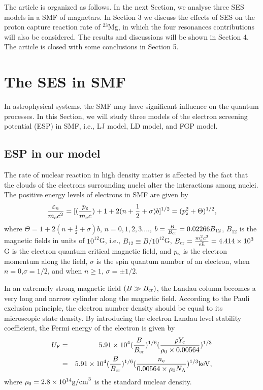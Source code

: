 \documentclass[manuscript]{aastex}
\begin{document}
The article is organized as follows. In the next Section, we analyse
three SES models in a SMF of magnetars. In Section 3 we discuss the
effects of SES on the proton capture reaction rate of $^{23}$Mg, in
which the four resonances contributions will also be considered. The
results and discussions will be shown in Section 4. The article is
closed with some conclusions in Section 5.

\section{The SES in SMF}

In astrophysical systems, the SMF may have significant influence on
the quantum processes. In this Section, we will study three models
of the electron screening potential (ESP) in SMF, i.e., LJ model, LD
model, and FGP model.

\subsection{ESP in our model}

The rate of nuclear reaction in high density matter is affected by
the fact that the clouds of the electrons surrounding nuclei alter
the interactions among nuclei. The positive energy levels of
electrons in SMF are given by \citep{Landau77}
\begin{equation}
   \frac{\varepsilon_n}{m_{\rm{e}} c^2}=[(\frac{p_{\rm{z}}}{m_{\rm{e}}c})+1+2(n+\frac{1}{2}+\sigma)b]^{1/2}=(p^2_{\rm{z}}+\Theta)^{1/2},
\label{1}
\end{equation}
 where $\Theta=1+2(n+\frac{1}{2}+\sigma)b$, $n=0,1,2,3....$,
 $b=\frac{B}{B_{\rm{cr}}}=0.02266B_{12}$, $B_{12}$
 is the magnetic fields in units of $10^{12}$G, i.e.,
 $B_{12}\equiv B/10^{12}$G,
$B_{\rm{cr}}=\frac{m^2_{\rm{e}} c^3}{e\hbar}=4.414\times10^3$G is
the electron quantum critical magnetic field, and $p_{\rm{z}}$ is
the electron momentum along the field, $\sigma$
 is the spin quantum number of an electron, when $n=0$,$\sigma=1/2$, and when $n\geq1$, $\sigma=\pm1/2$.

In an extremely strong magnetic field $(B\gg B_{\rm{cr}})$, the
Landau column becomes a very long and narrow cylinder along the
magnetic field. According to the Pauli exclusion principle, the
electron number density should be equal to its microscopic state
density. By introducing the electron Landau level stability
coefficient, the Fermi energy of the electron is given by
\citep{Gao13,zhu16}
\begin{eqnarray}
 U_{\rm{F}}&=&5.91\times10^4(\frac{B}{B_{{\rm{cr}}}})^{1/6}(\frac{\rho Y_{\rm{e}}}{\rho_0\times0.00564})^{1/3}\nonumber\\
 &=&5.91\times10^4(\frac{B}{B_{{\rm{cr}}}})^{1/6}(\frac{n_{\rm{e}}}{0.00564\times\rho_0
 N_{\rm{A}}})^{1/3}\rm{keV},
\label{4}
\end{eqnarray}
where $\rho_0=2.8\times 10^{14} {\rm g/cm}^3$  is the standard
nuclear density.
\end{document}
